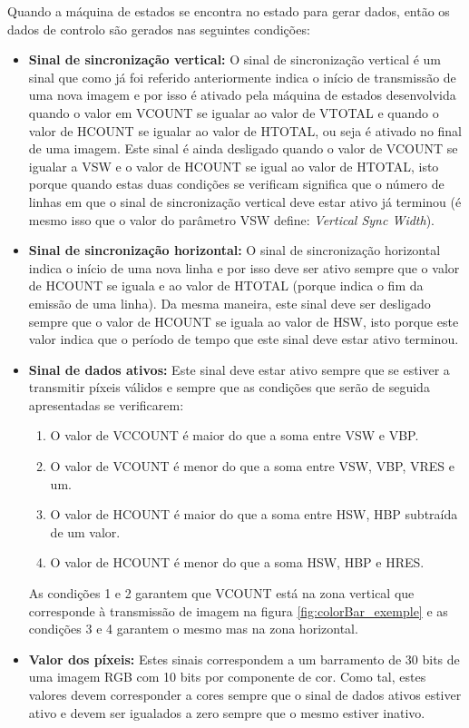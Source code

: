 Quando a máquina de estados se encontra no estado para gerar dados, então os dados de controlo são gerados nas seguintes condições:
\begin{itemize}
	\item \textbf{Sinal de sincronização vertical:} O sinal de sincronização vertical é um sinal que como já foi referido anteriormente indica o início de transmissão de uma nova imagem e por isso é ativado pela máquina de estados desenvolvida quando o valor em VCOUNT se igualar ao valor de VTOTAL e quando o valor de HCOUNT se igualar ao valor de HTOTAL, ou seja é ativado no final de uma imagem. Este sinal é ainda desligado quando o valor de VCOUNT se igualar a VSW e o valor de HCOUNT se igual ao valor de HTOTAL, isto porque quando estas duas condições se verificam significa que o número de linhas em que o sinal de sincronização vertical deve estar ativo já terminou (é mesmo isso que o valor do parâmetro VSW define: \textit{Vertical Sync Width}).
	
	\item \textbf{Sinal de sincronização horizontal:} O sinal de sincronização horizontal indica o início de uma nova linha e por isso deve ser ativo sempre que o valor de HCOUNT se iguala e ao valor de HTOTAL (porque indica o fim da emissão de uma linha). Da mesma maneira, este sinal deve ser desligado sempre que o valor de HCOUNT se iguala ao valor de HSW, isto porque este valor indica que o período de tempo que este sinal deve estar ativo terminou.
	
	\item \textbf{Sinal de dados ativos:} Este sinal deve estar ativo sempre que se estiver a transmitir píxeis válidos e sempre que as condições que serão de seguida apresentadas se verificarem:
	\begin{enumerate}
		\item O valor de VCCOUNT é maior do que a soma entre VSW e VBP.
		\item O valor de VCOUNT é menor do que a soma entre VSW, VBP, VRES e um.
		\item O valor de HCOUNT é maior do que a soma entre HSW, HBP subtraída de um valor.
		\item O valor de HCOUNT é menor do que a soma HSW, HBP e HRES.
	\end{enumerate}
	As condições 1 e 2 garantem que VCOUNT está na zona vertical que corresponde à transmissão de imagem na figura \ref{fig:colorBar_exemple} e as condições 3 e 4 garantem o mesmo mas na zona horizontal.
	
	\item \textbf{Valor dos píxeis:} Estes sinais correspondem a um barramento de 30 bits de uma imagem RGB com 10 bits por componente de cor. Como tal, estes valores devem corresponder a cores sempre que o sinal de dados ativos estiver ativo e devem ser igualados a zero sempre que o mesmo estiver inativo.
 
\end{itemize}

